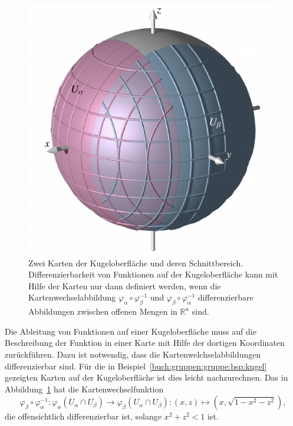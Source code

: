 \begin{beispiel}
\begin{figure}
\centering
\includegraphics{chapters/030-gruppen/images/kugelschnitt.pdf}
\caption{Zwei Karten der Kugeloberfläche und deren Schnittbereich.
Differenzierbarkeit von Funktionen auf der Kugeloberfläche kann mit
Hilfe der Karten nur dann definiert werden, wenn die Kartenwechselabbildung
$\varphi_\alpha\circ\varphi_\beta^{-1}$ und
$\varphi_\beta\circ\varphi_\alpha^{-1}$ differenzierbare Abbildungen
zwischen offenen Mengen in $\mathbb{R}^n$ sind.
\label{buch:gruppen:gruppe:fig:kugelkartenwechsel}}
\end{figure}
Die Ableitung von Funktionen auf einer Kugeloberfläche muss auf 
die Beschreibung der Funktion in einer Karte mit Hilfe der dortigen
Koordinaten zurückführen.
Dazu ist notwendig, dass die Kartenwelchselabbildungen differenzierbar
sind.
Für die in Beispiel~\ref{buch:gruppen:gruppe:bsp:kugel} gezeigten
Karten auf der Kugeloberfläche ist dies leicht nachzurechnen.
Das in Abbildung~\ref{buch:gruppen:gruppe:fig:kugelkartenwechsel}
hat die Kartenwechselfunktion
\[
\varphi_\beta
\circ
\varphi_\alpha^{-1}
\colon
\varphi_\alpha(U_\alpha\cap U_\beta)
\to
\varphi_\beta(U_\alpha\cap U_\beta)
:
(x,z) \mapsto (x,\!\sqrt{1-x^2-z^2}),
\]
die offensichtlich differenzierbar ist, solange $x^2+z^2<1$ ist.
\end{beispiel}

